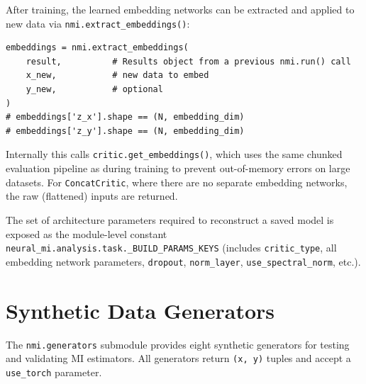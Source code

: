 \documentclass[12pt]{article}
\newcommand{\api}[1]{\texttt{#1}}
\begin{document}
After training, the learned embedding networks can be extracted and applied
to new data via \api{nmi.extract\_embeddings()}:

\begin{lstlisting}
embeddings = nmi.extract_embeddings(
    result,          # Results object from a previous nmi.run() call
    x_new,           # new data to embed
    y_new,           # optional
)
# embeddings['z_x'].shape == (N, embedding_dim)
# embeddings['z_y'].shape == (N, embedding_dim)
\end{lstlisting}

Internally this calls \api{critic.get\_embeddings()}, which uses the same
chunked evaluation pipeline as during training to prevent out-of-memory
errors on large datasets.  For \api{ConcatCritic}, where there are no
separate embedding networks, the raw (flattened) inputs are returned.

The set of architecture parameters required to reconstruct a saved model
is exposed as the module-level constant
\api{neural\_mi.analysis.task.\_BUILD\_PARAMS\_KEYS} (includes
\api{critic\_type}, all embedding network parameters, \api{dropout},
\api{norm\_layer}, \api{use\_spectral\_norm}, etc.).

\section{Synthetic Data Generators}
\label{sec:generators}

The \api{nmi.generators} submodule provides eight synthetic generators for
testing and validating MI estimators.  All generators return
\api{(x,\,y)} tuples and accept a \api{use\_torch} parameter.
\end{document}

